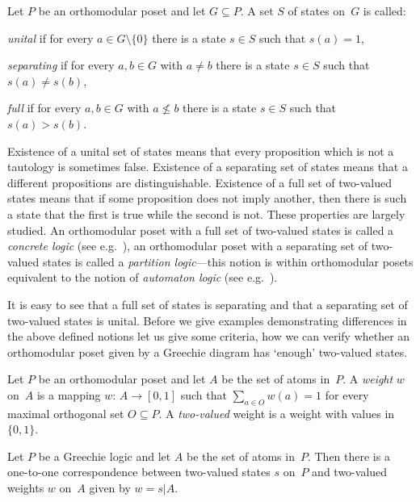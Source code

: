 \begin {definition}
Let $P$ be an orthomodular poset and let $G \subseteq P$. A set $S$ of
states on~$G$ is called:

{\em unital\/} if for every $a\in G \setminus \{0\}$ there is a state $s\in
S$ such that $s(a)=1$,

{\em separating\/} if for every $a,b\in G$ with $a \neq b$ there is a state
$s\in S$ such that $s(a) \neq s(b)$,

{\em full\/} if for every $a,b \in G$ with $a \not\le b$ there is a state $s
\in S$ such that $s(a) > s(b)$.
\end {definition}


Existence of a unital set of states means that every proposition which is
not a tautology is sometimes false. Existence of a separating set of states
means that a different propositions are distinguishable. Existence of a
full set of two-valued states means that if some proposition does not imply
another, then there is such a state that the first is true while the second
is not. These properties are largely studied. An orthomodular poset with a
full set of two-valued states is called a {\em concrete logic\/} (see
e.g.~\cite{Ptak-Pulmannova}), an orthomodular poset with a separating set of
two-valued states is called a {\em partition logic\/}---this notion is
within orthomodular posets equivalent to the notion of {\em automaton
logic\/} (see e.g.~\cite{svosh,svosh2,svosh3}).

It is easy to see that a full set of states is separating and that a
separating set of two-valued states is unital. Before we give examples
demonstrating differences in the above defined notions let us give some
criteria, how we can verify whether an orthomodular poset given by a
Greechie diagram has `enough' two-valued states.


\begin {definition}
Let $P$ be an orthomodular poset and let $A$ be the set of atoms in~$P$. A
{\em weight\/} $w$ on~$A$ is a mapping $w\colon\, A \to [0,1]$ such that
$\sum_{a \in O} w(a) = 1$ for every maximal orthogonal set $O \subseteq P$.
A {\em two-valued\/} weight is a weight with values in $\{0,1\}$.
\end {definition}


\begin {lemma} \label {s-w}
Let $P$ be a Greechie logic and let $A$ be the set of atoms in~$P$.
Then there is a one-to-one correspondence between two-valued states $s$
on~$P$ and two-valued weights $w$ on~$A$ given by $w=s|A$.
\end {lemma}


